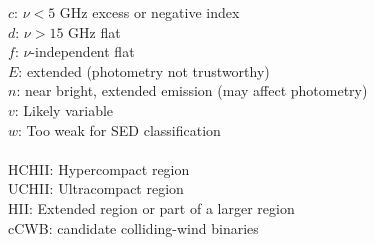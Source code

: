 \begin{table*}[htp]
$c$: $\nu<5$ GHz excess or negative index \\
$d$: $\nu>15$ GHz flat \\
$f$: $\nu$-independent flat \\
$E$: extended (photometry not trustworthy) \\
$n$: near bright, extended emission (may affect photometry) \\
$v$: Likely variable \\
$w$: Too weak for SED classification \\
\newline \\
HCHII: Hypercompact \hii region \\
UCHII: Ultracompact \hii region \\
HII: Extended \hii region or part of a larger \hii region \\
cCWB: candidate colliding-wind binaries \\

\end{table*}
